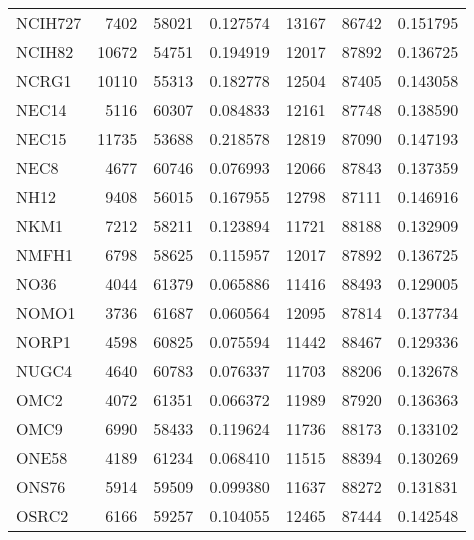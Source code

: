 \begin{tabular}{lrrrrrr}
                              NCIH727 &      7402 &    58021 &  0.127574 &     13167 &    86742 &  0.151795 \\
                               NCIH82 &     10672 &    54751 &  0.194919 &     12017 &    87892 &  0.136725 \\
                                NCRG1 &     10110 &    55313 &  0.182778 &     12504 &    87405 &  0.143058 \\
                                NEC14 &      5116 &    60307 &  0.084833 &     12161 &    87748 &  0.138590 \\
                                NEC15 &     11735 &    53688 &  0.218578 &     12819 &    87090 &  0.147193 \\
                                 NEC8 &      4677 &    60746 &  0.076993 &     12066 &    87843 &  0.137359 \\
                                 NH12 &      9408 &    56015 &  0.167955 &     12798 &    87111 &  0.146916 \\
                                 NKM1 &      7212 &    58211 &  0.123894 &     11721 &    88188 &  0.132909 \\
                                NMFH1 &      6798 &    58625 &  0.115957 &     12017 &    87892 &  0.136725 \\
                                 NO36 &      4044 &    61379 &  0.065886 &     11416 &    88493 &  0.129005 \\
                                NOMO1 &      3736 &    61687 &  0.060564 &     12095 &    87814 &  0.137734 \\
                                NORP1 &      4598 &    60825 &  0.075594 &     11442 &    88467 &  0.129336 \\
                                NUGC4 &      4640 &    60783 &  0.076337 &     11703 &    88206 &  0.132678 \\
                                 OMC2 &      4072 &    61351 &  0.066372 &     11989 &    87920 &  0.136363 \\
                                 OMC9 &      6990 &    58433 &  0.119624 &     11736 &    88173 &  0.133102 \\
                                ONE58 &      4189 &    61234 &  0.068410 &     11515 &    88394 &  0.130269 \\
                                ONS76 &      5914 &    59509 &  0.099380 &     11637 &    88272 &  0.131831 \\
                                OSRC2 &      6166 &    59257 &  0.104055 &     12465 &    87444 &  0.142548 \\

\end{tabular}
